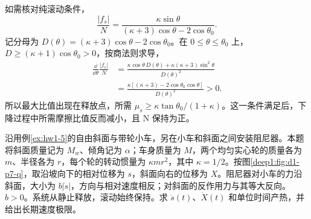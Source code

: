 \begin{solution}
如需核对纯滚动条件，
\[
\frac{|f_s|}{N}=\frac{\kappa\sin\theta}
{(\kappa+3)\cos\theta-2\cos\theta_0}.
\]
记分母为 $D(\theta)=(\kappa+3)\cos\theta-2\cos\theta_0$。在 $0\le\theta\le\theta_0$ 上，$D\ge(\kappa+1)\cos\theta_0>0$，按商法则求导，
\[
\begin{aligned}
\frac{\dd}{\dd\theta}\frac{|f_s|}{N}
&=\frac{\kappa\cos\theta\,D(\theta)+\kappa(\kappa+3)\sin^2\theta}{D(\theta)^2}\\
&=\frac{\kappa[(\kappa+3)-2\cos\theta_0\cos\theta]}{D(\theta)^2}>0.
\end{aligned}
\]
所以最大比值出现在释放点，所需 $\mu_s\ge\kappa\tan\theta_0/(1+\kappa)$。这一条件满足后，下降过程中所需摩擦比值反而减小，且 N 保持为正。

\end{solution}


\begin{exercise}[带内部阻尼的可动斜面]\label{deep1:problem-exercise-7}\label{deep1:exercise:d1-p7}
沿用例\ref{ex:hw1-5}的自由斜面与带轮小车，另在小车和斜面之间安装阻尼器。本题将斜面质量记为 $M_w$、倾角记为 $\alpha$；车身质量为 $M$，两个均匀实心轮的质量各为 $m$、半径各为 $r$，每个轮的转动惯量为 $\kappa mr^2$，其中 $\kappa=1/2$。按图\ref{deep1:fig:d1-p7-q}，取沿坡向下的相对位移为 $s$，斜面向右的位移为 $X$。阻尼器对小车的力沿斜面，大小为 $b|\dot s|$，方向与相对速度相反；对斜面的反作用力与其等大反向。$b>0$。系统从静止释放，滚动始终保持。求 $\dot s(t)$、$\dot X(t)$ 和单位时间产热，并给出长期速度极限。
\end{exercise}

